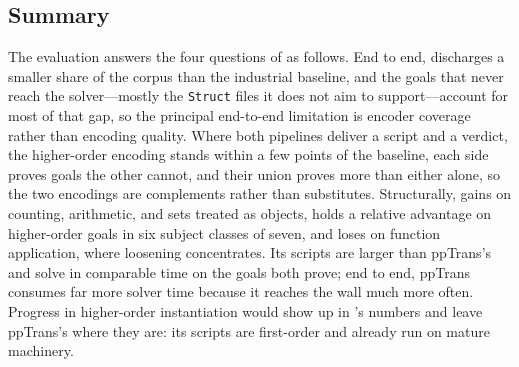\FloatBarrier
\subsection{Summary}
\label{sec:beer-results-summary}
The evaluation answers the four questions of  as follows.
End to end, \beer{} discharges a smaller share of the corpus than the industrial baseline, and the goals that never reach the solver---mostly the \texttt{Struct} files it does not aim to support---account for most of that gap, so the principal end-to-end limitation is encoder coverage rather than encoding quality.
Where both pipelines deliver a script and a verdict, the higher-order encoding stands within a few points of the baseline, each side proves goals the other cannot, and their union proves more than either alone, so the two encodings are complements rather than substitutes.
Structurally, \beer{} gains on counting, arithmetic, and sets treated as objects, holds a relative advantage on higher-order goals in six subject classes of seven, and loses on function application, where loosening concentrates.
Its scripts are larger than ppTrans's and solve in comparable time on the goals both prove; end to end, ppTrans consumes far more solver time because it reaches the wall much more often.
Progress in higher-order instantiation would show up in \beer{}'s numbers and leave ppTrans's where they are: its scripts are first-order and already run on mature machinery.
